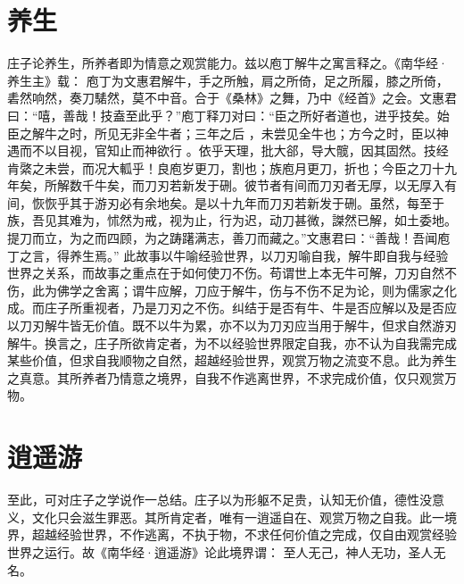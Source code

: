 \documentclass[11pt]{article}
\begin{document}
\section{养生}
庄子论养生，所养者即为情意之观赏能力。兹以庖丁解牛之寓言释之。《南华经·养生主》载：
庖丁为文惠君解牛，手之所触，肩之所倚，足之所履，膝之所倚，砉然响然，奏刀騞然，莫不中音。合于《桑林》之舞，乃中《经首》之会。文惠君曰：“嘻，善哉！技盍至此乎？”庖丁释刀对曰：“臣之所好者道也，进乎技矣。始臣之解牛之时，所见无非全牛者；三年之后 ，未尝见全牛也；方今之时，臣以神遇而不以目视，官知止而神欲行 。依乎天理，批大郤，导大髋，因其固然。技经肯綮之未尝，而况大軱乎！良庖岁更刀，割也；族庖月更刀，折也；今臣之刀十九年矣，所解数千牛矣，而刀刃若新发于硎。彼节者有间而刀刃者无厚，以无厚入有间，恢恢乎其于游刃必有余地矣。是以十九年而刀刃若新发于硎。虽然，每至于族，吾见其难为，怵然为戒，视为止，行为迟，动刀甚微，謋然已解，如土委地。提刀而立，为之而四顾，为之踌躇满志，善刀而藏之。”文惠君曰：“善哉！吾闻庖丁之言，得养生焉。”
此故事以牛喻经验世界，以刀刃喻自我，解牛即自我与经验世界之关系，而故事之重点在于如何使刀不伤。苟谓世上本无牛可解，刀刃自然不伤，此为佛学之舍离；谓牛应解，刀应于解牛，伤与不伤不足为论，则为儒家之化成。而庄子所重视者，乃是刀刃之不伤。纠结于是否有牛、牛是否应解以及是否应以刀刃解牛皆无价值。既不以牛为累，亦不以为刀刃应当用于解牛，但求自然游刃解牛。换言之，庄子所欲肯定者，为不以经验世界限定自我，亦不认为自我需完成某些价值，但求自我顺物之自然，超越经验世界，观赏万物之流变不息。此为养生之真意。其所养者乃情意之境界，自我不作逃离世界，不求完成价值，仅只观赏万物。

\section{逍遥游}
至此，可对庄子之学说作一总结。庄子以为形躯不足贵，认知无价值，德性没意义，文化只会滋生罪恶。其所肯定者，唯有一逍遥自在、观赏万物之自我。此一境界，超越经验世界，不作逃离，不执于物，不求任何价值之完成，仅自由观赏经验世界之运行。故《南华经·逍遥游》论此境界谓：
至人无己，神人无功，圣人无名。
  
\end{document}
